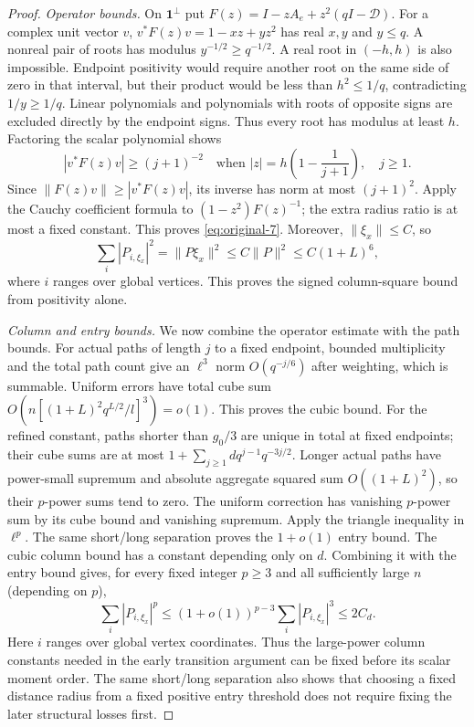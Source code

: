 \begin{proof}
\emph{Operator bounds.}
On $\mathbf1^\perp$ put
$F(z)=I-zA_e+z^2(qI-\mathcal D)$. For a complex unit vector $v$,
$v^*F(z)v=1-xz+yz^2$ has real $x,y$ and $y\le q$. A nonreal pair of
roots has modulus $y^{-1/2}\ge q^{-1/2}$. A real root in $(-h,h)$ is
also impossible. Endpoint positivity would require another root on
the same side of zero in that interval, but their product would be
less than $h^2\le1/q$, contradicting $1/y\ge1/q$. Linear polynomials
and polynomials with roots of opposite signs are excluded directly
by the endpoint signs. Thus every root has modulus at least $h$.
Factoring the scalar polynomial shows
\[
 |v^*F(z)v|\ge(j+1)^{-2}
 \quad\text{when }|z|=h\left(1-\frac1{j+1}\right),\quad j\ge1.
\]
Since $\|F(z)v\|\ge|v^*F(z)v|$, its inverse has norm at most
$(j+1)^2$. Apply the Cauchy coefficient formula to
$(1-z^2)F(z)^{-1}$; the extra radius ratio is at most a fixed
constant. This proves \eqref{eq:original-7}. Moreover,
$\|\xi_x\|\le C$, so
\[
 \sum_i|P_{i,\xi_x}|^2=\|P\xi_x\|^2
 \le C\|P\|^2\le C(1+L)^6,
\]
where $i$ ranges over global vertices. This proves the signed
column-square bound from positivity alone.

\emph{Column and entry bounds.}
We now combine the operator estimate with the path bounds.
For actual paths of length $j$ to a fixed endpoint, bounded
multiplicity and the total path count give an $\ell^3$ norm
$O(q^{-j/6})$ after weighting, which is summable. Uniform errors have
total cube sum
$O(n[(1+L)^2q^{L/2}/l]^3)=o(1)$. This proves the cubic bound. For the
refined constant, paths shorter than $g_0/3$ are unique in total at
fixed endpoints; their cube sums are at most
$1+\sum_{j\ge1}dq^{j-1}q^{-3j/2}$. Longer actual paths have power-small
supremum and absolute aggregate squared sum $O((1+L)^2)$, so their
$p$-power sums tend to zero. The uniform correction has vanishing
$p$-power sum by its cube bound and vanishing supremum. Apply the triangle inequality in
$\ell^p$. The same short/long separation proves the $1+o(1)$ entry
bound. The cubic column bound has a constant depending only on $d$.
Combining it with the entry bound gives, for every fixed integer $p\ge3$
and all sufficiently large $n$ (depending on $p$),
\[
 \sum_i |P_{i,\xi_x}|^p
 \le (1+o(1))^{p-3}\sum_i |P_{i,\xi_x}|^3
 \le 2C_d.
\]
Here $i$ ranges over global vertex coordinates. Thus the large-power
column constants needed in the early transition
argument can be fixed before its scalar moment order. The same
short/long separation also shows that choosing a fixed distance radius
from a fixed positive entry threshold does not require fixing the later
structural losses first.
\end{proof}

